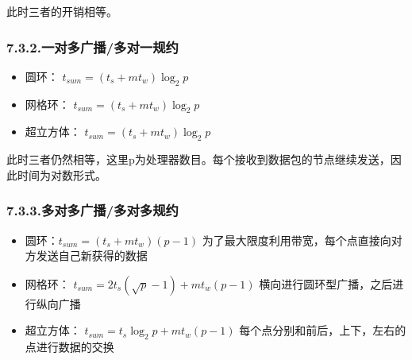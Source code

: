 \documentclass{article}
\begin{document}
\noindent{}此时三者的开销相等。%

\subsubsection{7.3.2.\hspace*{0.5em}一对多广播/多对一规约}\label{section}%

\begin{itemize}[noitemsep,topsep=\mdcompacttopsep]%

\item{}圆环： $t_{sum} = (t_s + mt_w) \log _2 p$%

\item{}网格环： $t_{sum} = (t_s + mt_w) \log _2 p$%

\item{}超立方体： $t_{sum} = (t_s + mt_w) \log _2 p$%
\end{itemize}%

\noindent{}此时三者仍然相等，这里p为处理器数目。每个接收到数据包的节点继续发送，因此时间为对数形式。%

\subsubsection{7.3.3.\hspace*{0.5em}多对多广播/多对多规约}\label{section}%

\begin{itemize}[noitemsep,topsep=\mdcompacttopsep]%

\item{}圆环：$t_{sum} = (t_s + mt_w)(p - 1)$ 为了最大限度利用带宽，每个点直接向对方发送自己新获得的数据%

\item{}网格环： $t_{sum} = 2t_s(\sqrt {p} - 1) + mt_w(p  - 1)$ 横向进行圆环型广播，之后进行纵向广播%

\item{}超立方体： $t_{sum} = t_s{\log _2 p} + mt_w(p - 1)$  每个点分别和前后，上下，左右的点进行数据的交换%
\end{itemize}%
\end{document}
